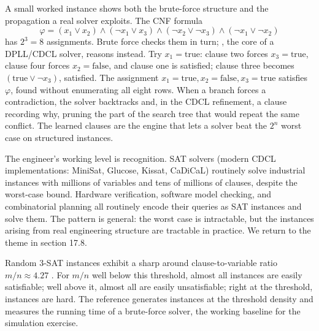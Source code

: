 A small worked instance shows both the brute-force structure and the
propagation a real solver exploits. The CNF formula
\[
\varphi = (x_{1} \lor x_{2}) \land (\lnot x_{1} \lor x_{3})
\land (\lnot x_{2} \lor \lnot x_{3}) \land (\lnot x_{1} \lor
\lnot x_{2})
\]
has $2^{3} = 8$ assignments. Brute force checks them in turn;
, the core of a DPLL/CDCL solver, reasons
instead. Try $x_{1} = \text{true}$: clause two forces $x_{3} =
\text{true}$, clause four forces $x_{2} = \text{false}$, and clause
one is satisfied; clause three becomes $(\text{true} \lor \lnot
x_{3})$, satisfied. The assignment $x_{1} = \text{true}, x_{2} =
\text{false}, x_{3} = \text{true}$ satisfies $\varphi$, found
without enumerating all eight rows. When a branch forces a
contradiction, the solver backtracks and, in the CDCL refinement,
 a clause recording why, pruning the part of the
search tree that would repeat the same conflict. The learned clauses
are the engine that lets a solver beat the $2^{n}$ worst case on
structured instances.

The engineer's working level is recognition. SAT solvers (modern
CDCL implementations: MiniSat, Glucose, Kissat, CaDiCaL) routinely
solve industrial instances with millions of variables and tens of
millions of clauses, despite the worst-case bound. Hardware
verification, software model checking, and combinatorial planning
all routinely encode their queries as SAT instances and solve them.
The pattern is general: the worst case is intractable, but the
instances arising from real engineering structure are tractable in
practice. We return to the theme in section 17.8.

Random 3-SAT instances exhibit a sharp  around clause-to-variable ratio $m/n \approx 4.27$
\cite{paper:v2ch17-cheeseman-sat-1991}. For $m/n$ well below this
threshold, almost all instances are easily satisfiable; well above
it, almost all are easily unsatisfiable; right at the threshold,
instances are hard. The reference
generates instances at the threshold density and measures the
running time of a brute-force solver, the working baseline for the
simulation exercise.

